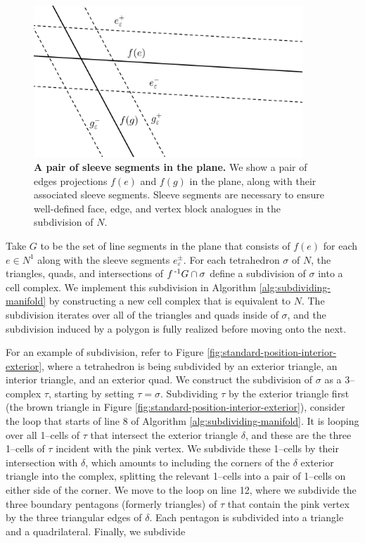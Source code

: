 \begin{figure}[h!]
	\centering
	\includegraphics[width=0.9\textwidth]{figures/pl-sleeves.png}
	\caption{
		\textbf{A pair of sleeve segments in the plane.}
		We show a pair of edges projections $f(e)$ and $f(g)$ in the plane, along with their associated sleeve segments.
		Sleeve segments are necessary to ensure well-defined face, edge, and vertex block analogues in the subdivision of $N$.
	}
	\label{fig:pl-sleeves}
\end{figure}

Take $G$ to be the set of line segments in the plane that consists of $f(e)$ for each $e\in N^1$ along with the sleeve segments $e_\varepsilon^\pm$.
For each tetrahedron $\sigma$ of $N$, the triangles, quads, and intersections of $f^{\,\text{-}1} G\cap\sigma$ define a subdivision of $\sigma$ into a cell complex.
We implement this subdivision in Algorithm \ref{alg:subdividing-manifold} by constructing a new cell complex that is equivalent to $N$.
The subdivision iterates over all of the triangles and quads inside of $\sigma$, and the subdivision induced by a polygon is fully realized before moving onto the next.

For an example of subdivision, refer to Figure \ref{fig:standard-position-interior-exterior}, where a tetrahedron is being subdivided by an exterior triangle, an interior triangle, and an exterior quad.
We construct the subdivision of $\sigma$ as a 3--complex $\tau$, starting by setting $\tau = \sigma$.
Subdividing $\tau$ by the exterior triangle first (the brown triangle in Figure \ref{fig:standard-position-interior-exterior}), consider the loop that starts of line 8 of Algorithm \ref{alg:subdividing-manifold}.
It is looping over all 1--cells of $\tau$ that intersect the exterior triangle $\delta$, and these are the three 1--cells of $\tau$ incident with the pink vertex.
We subdivide these 1--cells by their intersection with $\delta$, which amounts to including the corners of the $\delta$ exterior triangle into the complex, splitting the relevant 1--cells into a pair of 1--cells on either side of the corner.
We move to the loop on line 12, where we subdivide the three boundary pentagons (formerly triangles) of $\tau$ that contain the pink vertex by the three triangular edges of $\delta$.
Each pentagon is subdivided into a triangle and a quadrilateral.
Finally, we subdivide

